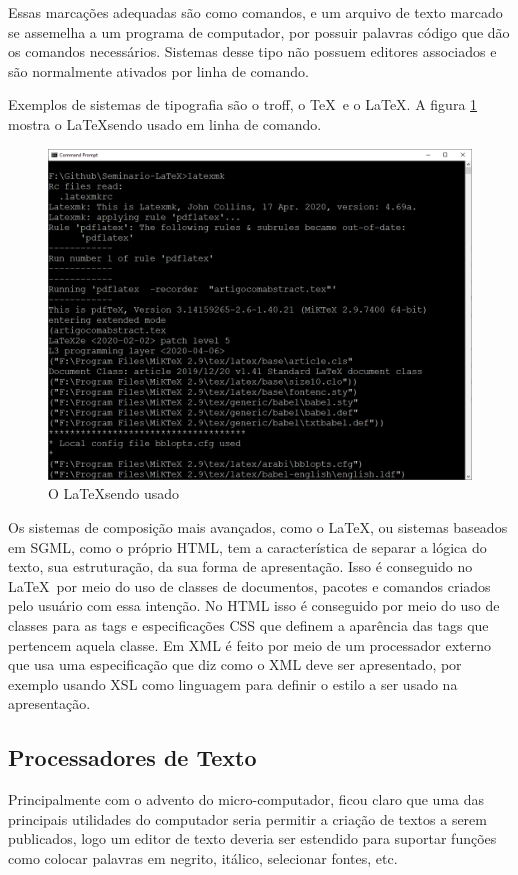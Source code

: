 Essas marcações adequadas são como comandos, e um arquivo de texto marcado se assemelha a um programa de computador, por possuir palavras código que dão os comandos necessários. Sistemas desse tipo não possuem editores associados e são normalmente ativados por linha de comando.

Exemplos de sistemas de tipografia são o troff, o \TeX\ e o \LaTeX. A figura \ref{fig:latex2} mostra o \LaTeX sendo usado em linha de comando.

\begin{figure}[hbt]
    \centering
    \includegraphics[width=0.7\linewidth]{Images/latex2}
    \caption[O \LaTeX sendo usado]{O \LaTeX sendo usado}
    \label{fig:latex2}
\end{figure}

Os sistemas de composição mais avançados, como o \LaTeX, ou sistemas baseados em SGML, como o próprio HTML, tem a característica de separar a lógica do texto, sua estruturação, da sua forma de apresentação. Isso é conseguido no \LaTeX\ por meio do uso de classes de documentos, pacotes e comandos criados pelo usuário com essa intenção. No HTML isso é conseguido por meio do uso de classes para as tags e especificações CSS que definem a aparência das tags que pertencem aquela classe. Em XML é feito por meio de um processador externo que usa uma especificação que diz como o XML deve ser apresentado, por exemplo usando XSL como linguagem para definir o estilo a ser usado na apresentação. 

\subsection{Processadores de Texto}

Principalmente com o advento do micro-computador, ficou claro que uma das principais utilidades do computador seria permitir a criação de textos a serem publicados, logo um editor de texto deveria ser estendido para suportar funções como colocar palavras em negrito, itálico, selecionar fontes, etc.

